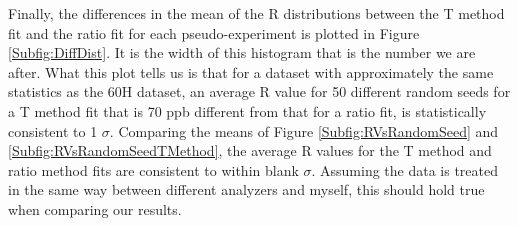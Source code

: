 Finally, the differences in the mean of the R distributions between the T method fit and the ratio fit for each pseudo-experiment is plotted in Figure \ref{Subfig:DiffDist}. It is the width of this histogram that is the number we are after. What this plot tells us is that for a dataset with approximately the same statistics as the 60H dataset, an average R value for 50 different random seeds for a T method fit that is 70 ppb different from that for a ratio fit, is statistically consistent to 1 $\sigma$. Comparing the means of Figure \ref{Subfig:RVsRandomSeed} and \ref{Subfig:RVsRandomSeedTMethod}, the average R values for the T method and ratio method fits are consistent to within blank $\sigma$. Assuming the data is treated in the same way between different analyzers and myself, this should hold true when comparing our results.

